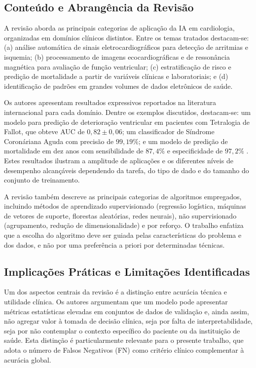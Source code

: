 \subsection{Conte\'udo e Abrang\^encia da Revis\~ao}

A revis\~ao aborda as principais categorias de aplica\c c\~ao da IA em cardiologia, organizadas em dom\'inios cl\'inicos distintos. Entre os temas tratados destacam-se: (a) an\'alise autom\'atica de sinais eletrocardiogr\'aficos para detec\c c\~ao de arritmias e isquemia; (b) processamento de imagens ecocardiogr\'aficas e de resson\^ancia magn\'etica para avalia\c c\~ao de fun\c c\~ao ventricular; (c) estratifica\c c\~ao de risco e predi\c c\~ao de mortalidade a partir de vari\'aveis cl\'inicas e laboratoriais; e (d) identifica\c c\~ao de padr\~oes em grandes volumes de dados eletr\^onicos de sa\'ude.

Os autores apresentam resultados expressivos reportados na literatura internacional para cada dom\'inio. Dentre os exemplos discutidos, destacam-se: um modelo para predi\c c\~ao de deteriora\c c\~ao ventricular em pacientes com Tetralogia de Fallot, que obteve AUC de $0{,}82 \pm 0{,}06$; um classificador de S\'indrome Coron\'ariana Aguda com precis\~ao de $99{,}19\%$; e um modelo de predi\c c\~ao de mortalidade em dez anos com sensibilidade de $87{,}4\%$ e especificidade de $97{,}2\%$ \cite{mesquita2020}. Estes resultados ilustram a amplitude de aplica\c c\~oes e os diferentes n\'iveis de desempenho alcan\c c\'aveis dependendo da tarefa, do tipo de dado e do tamanho do conjunto de treinamento.

A revis\~ao tamb\'em descreve as principais categorias de algoritmos empregados, incluindo m\'etodos de aprendizado supervisionado (regress\~ao log\'istica, m\'aquinas de vetores de suporte, florestas aleat\'orias, redes neurais), n\~ao supervisionado (agrupamento, redu\c c\~ao de dimensionalidade) e por refor\c co. O trabalho enfatiza que a escolha do algoritmo deve ser guiada pelas caracter\'isticas do problema e dos dados, e n\~ao por uma prefer\^encia a priori por determinadas t\'ecnicas.

\subsection{Implica\c c\~oes Pr\'aticas e Limita\c c\~oes Identificadas}

Um dos aspectos centrais da revis\~ao \'e a distin\c c\~ao entre acur\'acia t\'ecnica e utilidade cl\'inica. Os autores argumentam que um modelo pode apresentar m\'etricas estat\'isticas elevadas em conjuntos de dados de valida\c c\~ao e, ainda assim, n\~ao agregar valor \`a tomada de decis\~ao cl\'inica, seja por falta de interpretabilidade, seja por n\~ao contemplar o contexto espec\'ifico do paciente ou da institui\c c\~ao de sa\'ude. Esta distin\c c\~ao \'e particularmente relevante para o presente trabalho, que adota o n\'umero de Falsos Negativos (FN) como crit\'erio cl\'inico complementar \`a acur\'acia global.

